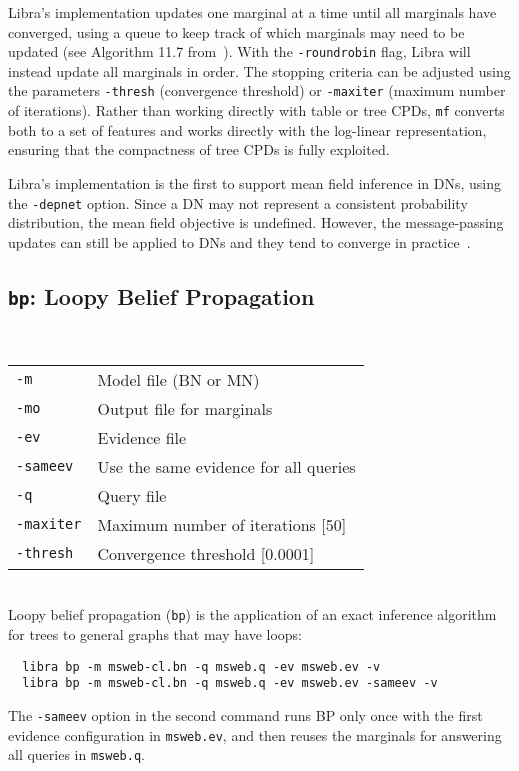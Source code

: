 \documentclass[11pt]{article}
\begin{document}
Libra's implementation updates one marginal at a time until all
marginals have converged, using a queue to keep track of which
marginals may need to be updated (see Algorithm 11.7
from~\cite{koller&friedman09}).  With the {\tt -roundrobin} flag,
Libra will instead update all marginals in order.  The stopping
criteria can be adjusted using the parameters {\tt -thresh}
(convergence threshold) or {\tt -maxiter} (maximum number of
iterations).  Rather than working directly with table or tree CPDs,
{\tt mf} converts both to a set of features and works directly with
the log-linear representation, ensuring that the compactness of tree
CPDs is fully exploited.

Libra's implementation is the first to support mean field inference in
DNs, using the {\tt -depnet} option.  Since a DN may not represent a
consistent probability distribution, the mean field objective is
undefined.  However, the message-passing updates can still be applied
to DNs and they tend to converge in practice~\cite{lowd&shamaei11}.

\subsection{{\tt bp}: Loopy Belief Propagation} \label{sec:bp}

\noindent {} \\
\begin{tabular}{ll}
{\tt -m} &        Model file (BN or MN) \\
{\tt -mo} &       Output file for marginals \\
{\tt -ev} &       Evidence file \\
{\tt -sameev} &   Use the same evidence for all queries \\
{\tt -q} &        Query file \\
{\tt -maxiter} &  Maximum number of iterations [50] \\
{\tt -thresh} &   Convergence threshold [0.0001] \\
\end{tabular} \\

Loopy belief propagation ({\tt bp}) is the application of an exact
inference algorithm for trees to general graphs that may have loops:
\begin{verbatim}
  libra bp -m msweb-cl.bn -q msweb.q -ev msweb.ev -v
  libra bp -m msweb-cl.bn -q msweb.q -ev msweb.ev -sameev -v
\end{verbatim}
The {\tt -sameev} option in the second command runs BP only once with
the first evidence configuration in {\tt msweb.ev}, and then reuses the
marginals for answering all queries in {\tt msweb.q}.
\end{document}
